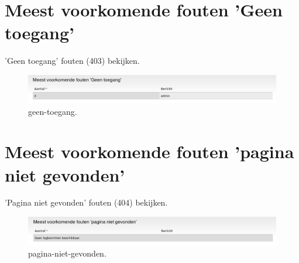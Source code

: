     
\section{Meest voorkomende fouten 'Geen toegang'} 
    'Geen toegang' fouten (403) bekijken.
\begin{figure}[!h]
    \centering
   \includegraphics[scale=0.4,angle=0]{geen-toegang}
   \caption{geen-toegang.\label{white}}
 \end{figure}     
    
    
\section{Meest voorkomende fouten 'pagina niet gevonden'}  'Pagina niet gevonden' fouten (404) bekijken.
\begin{figure}[!h]
    \centering
   \includegraphics[scale=0.4,angle=0]{pagina-niet-gevonden}
   \caption{pagina-niet-gevonden.\label{white}}
 \end{figure} 



